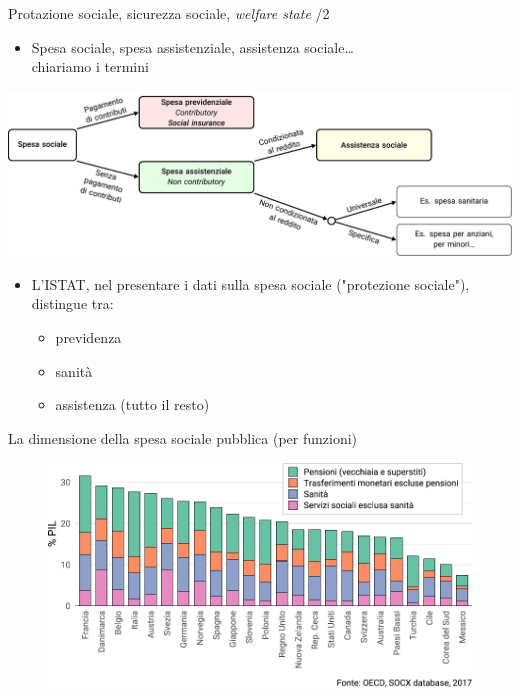 \documentclass[aspectratio=64,11pt]{beamer}
\begin{document}
\begin{frame}{Protazione sociale, sicurezza sociale, \emph{welfare state} /2}
\begin{itemize}
\item Spesa sociale, spesa assistenziale, assistenza sociale\ldots{}\\[0pt]
chiariamo i termini
\end{itemize}

\begin{center}
\includegraphics[width=\linewidth]{./figure/spesa-sociale-classificazione.pdf}
\end{center}

\begin{itemize}
\item L'ISTAT, nel presentare i dati sulla spesa sociale ("protezione sociale"), distingue tra:
\begin{itemize}
\item previdenza
\item sanità
\item assistenza (tutto il resto)
\end{itemize}
\end{itemize}
\end{frame}

\begin{frame}{La dimensione della spesa sociale pubblica (per funzioni)}
\begin{figure}[htbp]
\centering
\includegraphics[width=.95\textwidth]{./figure/spesa-sociale-lorda-per-aree-principali-color.pdf}
\end{figure}
\end{frame}
\end{document}
